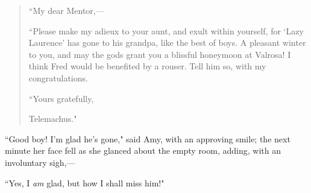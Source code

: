 \begin{quote}
``My dear Mentor,---

``Please make my adieux to your aunt, and exult within yourself, for
`Lazy Laurence' has gone to his
grandpa, like the best of boys. A pleasant winter to you, and may the
gods grant you a blissful honeymoon at Valrosa! I think Fred would be
benefited by a rouser. Tell him so, with my congratulations.

{``Yours gratefully,}

Telemachus."
\end{quote}

``Good boy! I'm glad he's gone," said
Amy, with an approving smile; the next minute her face fell as she
glanced about the empty room, adding, with an involuntary sigh,---

``Yes, I \emph{am} glad, but how I shall miss him!"
